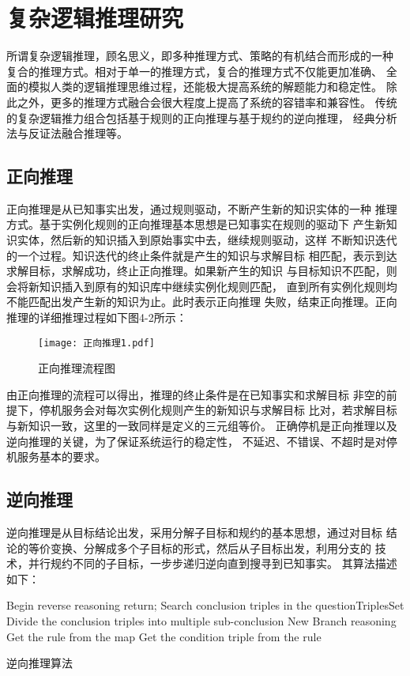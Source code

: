 \documentclass{standalone}
\begin{document}
\section{复杂逻辑推理研究}
所谓复杂逻辑推理，顾名思义，即多种推理方式、策略的有机结合而形成的一种
复合的推理方式。相对于单一的推理方式，复合的推理方式不仅能更加准确、
全面的模拟人类的逻辑推理思维过程，还能极大提高系统的解题能力和稳定性。
除此之外，更多的推理方式融合会很大程度上提高了系统的容错率和兼容性。
传统的复杂逻辑推力组合包括基于规则的正向推理与基于规约的逆向推理，
经典分析法与反证法融合推理等。
\subsection{正向推理}
正向推理是从已知事实出发，通过规则驱动，不断产生新的知识实体的一种
推理方式。基于实例化规则的正向推理基本思想是已知事实在规则的驱动下
产生新知识实体，然后新的知识插入到原始事实中去，继续规则驱动，这样
不断知识迭代的一个过程。知识迭代的终止条件就是产生的知识与求解目标
相匹配，表示到达求解目标，求解成功，终止正向推理。如果新产生的知识
与目标知识不匹配，则会将新知识插入到原有的知识库中继续实例化规则匹配，
直到所有实例化规则均不能匹配出发产生新的知识为止。此时表示正向推理
失败，结束正向推理。正向推理的详细推理过程如下图4-2所示：

\begin{figure}[htbp]
	\texttt{[image: 正向推理1.pdf]}
	\caption{正向推理流程图}
	\label{正向推理1}
\end{figure}
由正向推理的流程可以得出，推理的终止条件是在已知事实和求解目标
非空的前提下，停机服务会对每次实例化规则产生的新知识与求解目标
比对，若求解目标与新知识一致，这里的一致同样是定义的三元组等价。
正确停机是正向推理以及逆向推理的关键，为了保证系统运行的稳定性，
不延迟、不错误、不超时是对停机服务基本的要求。

\subsection{逆向推理}
逆向推理是从目标结论出发，采用分解子目标和规约的基本思想，通过对目标
结论的等价变换、分解成多个子目标的形式，然后从子目标出发，利用分支的
技术，并行规约不同的子目标，一步步递归逆向直到搜寻到已知事实。
其算法描述如下：
\begin{algorithm}[H]
    Begin reverse reasoning\;
	 {
		return;
    }
	 {
		Search conclusion triples in the questionTriplesSet\;
		\quad Divide the conclusion triples into multiple sub-conclusion\;
    }
	New Branch reasoning\;
	 {
    	Get the rule from the map\;
		\quad Get the condition triple from the rule\;
		  {
    	}
    }
	\caption{逆向推理算法}
	\label{dfs}
\end{algorithm}
\end{document}
